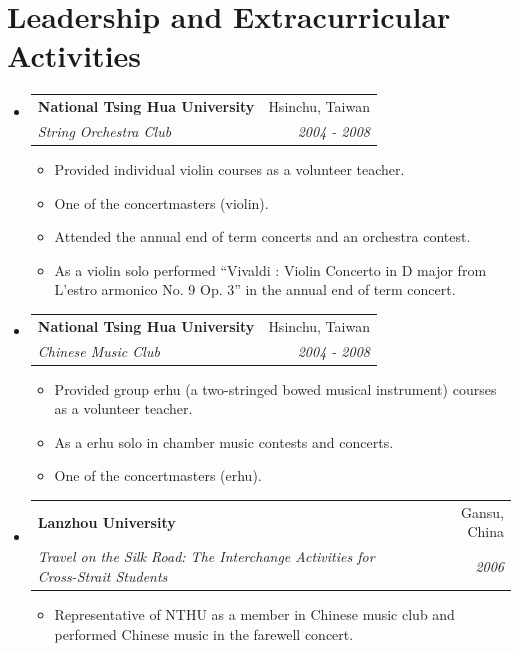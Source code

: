\documentclass[letterpaper,11pt]{article}
\makeatletter
\newcommand{\resumeSubheading}[4]{
  \vspace{-1pt}\item
    \begin{tabular*}{0.97\textwidth}{l@{\extracolsep{\fill}}r}
      \textbf{#1} & #2 \\
      \textit{\small#3} & \textit{\small #4} \\
    \end{tabular*}\vspace{-5pt}
}
\newcommand{\resumeSubHeadingListStart}{\begin{itemize}[leftmargin=*]}
\newcommand{\resumeSubHeadingListEnd}{\end{itemize}}
\newcommand{\resumeItemListStart}{\begin{itemize}}
\newcommand{\resumeItemListEnd}{\end{itemize}\vspace{-5pt}}
\makeatother
\begin{document}
\section{Leadership and Extracurricular Activities }
  \resumeSubHeadingListStart

    \resumeSubheading
      {National Tsing Hua University}{Hsinchu, Taiwan}
      {String Orchestra Club}{2004 - 2008}
      \resumeItemListStart
		  \item Provided individual violin courses as a volunteer teacher.
		  \item One of the concertmasters (violin).
		  \item Attended the annual end of term concerts and an orchestra contest.
		  \item As a violin solo performed ``Vivaldi : Violin Concerto in D major from L'estro armonico No. 9 Op. 3'' in the annual end of term concert.
      \resumeItemListEnd

    \resumeSubheading
      {National Tsing Hua University}{Hsinchu, Taiwan}
      {Chinese Music Club}{2004 - 2008}
      \resumeItemListStart
		  \item Provided group erhu (a two-stringed bowed musical instrument) courses as a volunteer teacher.
		  \item As a erhu solo in chamber music contests and concerts.
		  \item One of the concertmasters (erhu).
      \resumeItemListEnd

    \resumeSubheading
      {Lanzhou University}{Gansu, China}
      {Travel on the Silk Road: The Interchange Activities for Cross-Strait Students}{2006}
      \resumeItemListStart
		  \item Representative of NTHU as a member in Chinese music club and performed Chinese
		  music in the farewell concert.
      \resumeItemListEnd
   
  \resumeSubHeadingListEnd
\end{document}
